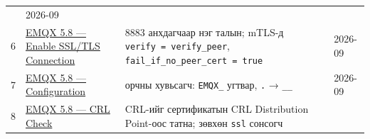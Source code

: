 \begin{longtable}[]{@{}llll@{}}
\begin{minipage}[t]{0.22\columnwidth}
\end{minipage} & \begin{minipage}[t]{0.22\columnwidth}\raggedright
2026-09\strut
\end{minipage}\tabularnewline
\begin{minipage}[t]{0.22\columnwidth}\raggedright
6\strut
\end{minipage} & \begin{minipage}[t]{0.22\columnwidth}\raggedright
\href{https://docs.emqx.com/en/emqx/v5.8/guides/network/emqx-mqtt-tls.html}{EMQX 5.\allowbreak{}8 --- Enable SSL/\allowbreak{}TLS Connection}\strut
\end{minipage} & \begin{minipage}[t]{0.22\columnwidth}\raggedright
8883 анхдагчаар нэг талын; mTLS-д \texttt{verify\ =\allowbreak{}\ verify\_\allowbreak{}peer}, \texttt{fail\_\allowbreak{}if\_\allowbreak{}no\_\allowbreak{}peer\_\allowbreak{}cert\ =\allowbreak{}\ true}\strut
\end{minipage} & \begin{minipage}[t]{0.22\columnwidth}\raggedright
2026-09\strut
\end{minipage}\tabularnewline
\begin{minipage}[t]{0.22\columnwidth}\raggedright
7\strut
\end{minipage} & \begin{minipage}[t]{0.22\columnwidth}\raggedright
\href{https://docs.emqx.com/en/emqx/v5.8/guides/configuration/configuration.html}{EMQX 5.\allowbreak{}8 --- Configuration}\strut
\end{minipage} & \begin{minipage}[t]{0.22\columnwidth}\raggedright
орчны хувьсагч: \texttt{EMQX\_} угтвар, \texttt{.} → \texttt{\_\allowbreak{}\_\allowbreak{}}\strut
\end{minipage} & \begin{minipage}[t]{0.22\columnwidth}\raggedright
2026-09\strut
\end{minipage}\tabularnewline
\begin{minipage}[t]{0.22\columnwidth}\raggedright
8\strut
\end{minipage} & \begin{minipage}[t]{0.22\columnwidth}\raggedright
\href{https://docs.emqx.com/en/emqx/v5.8/guides/network/crl.html}{EMQX 5.\allowbreak{}8 --- CRL Check}\strut
\end{minipage} & \begin{minipage}[t]{0.22\columnwidth}\raggedright
CRL-ийг сертификатын CRL Distribution Point-оос татна; зөвхөн \texttt{ssl} сонсогч\strut

\end{minipage}
\end{longtable}
